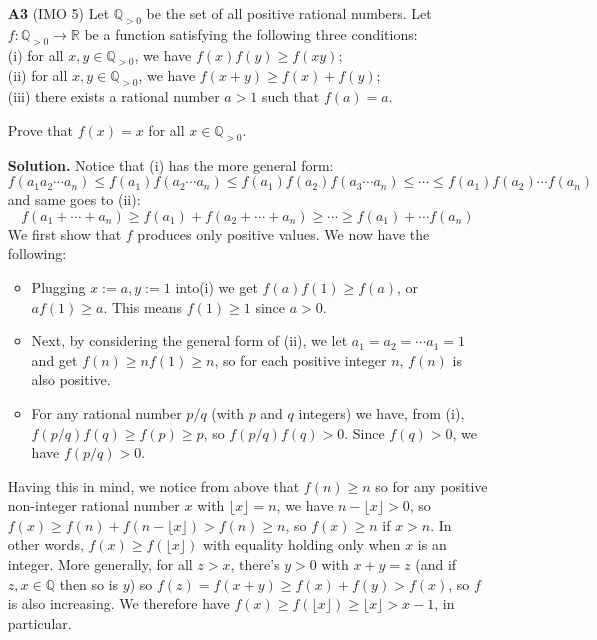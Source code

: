 \documentclass[11pt,a4paper]{article}
\begin{document}
\begin{enumerate}
	\item [\textbf{A3}] (IMO 5)
	Let $\mathbb Q_{>0}$ be the set of all positive rational numbers. Let $f:\mathbb Q_{>0}\to\mathbb R$ be a function satisfying the following three conditions:\\
	(i) for all $x,y\in\mathbb Q_{>0}$, we have $f(x)f(y)\geq f(xy)$;\\
	(ii) for all $x,y\in\mathbb Q_{>0}$, we have $f(x+y)\geq f(x)+f(y)$;\\
	(iii) there exists a rational number $a>1$ such that $f(a)=a$.
	
	Prove that $f(x)=x$ for all $x\in\mathbb Q_{>0}$.
	
	\textbf{Solution.} 
	Notice that (i) has the more general form: 
	\[
	f(a_1a_2\cdots a_n)
	\le f(a_1)f(a_2\cdots a_n)
	\le f(a_1)f(a_2)f(a_3\cdots a_n)
	\le\cdots
	\le f(a_1)f(a_2)\cdots f(a_n)
	\]
	and same goes to (ii):
	\[
	f(a_1+\cdots + a_n)
	\ge f(a_1)+f(a_2+\cdots + a_n)
	\ge
	\cdots
	\ge f(a_1)+\cdots f(a_n)
	\]
	We first show that $f$ produces only positive values. We now have the following:
	\begin{itemize}
		\item Plugging $x:=a, y:=1$ into(i) we get $f(a)f(1)\ge f(a)$, or $af(1)\ge a$. This means $f(1)\ge 1$ since $a>0$. 
		
		\item Next, by considering the general form of (ii), we let $a_1=a_2=\cdots a_1=1$ and get $f(n)\ge nf(1)\ge n$, so for each positive integer $n$, $f(n)$ is also positive. 
		
		\item For any rational number $p/q$ (with $p$ and $q$ integers) we have, from (i), $f(p/q)f(q)\ge f(p)\ge p$, so $f(p/q)f(q)>0$. 
		Since $f(q)>0$, we have $f(p/q)>0$. 
		
	\end{itemize}
	
	Having this in mind, we notice from above that $f(n)\ge n$ so for any positive non-integer rational number $x$ with $\lfloor x\rfloor=n$, we have $n-\lfloor x\rfloor>0$, so $f(x)\ge f(n)+f(n-\lfloor x\rfloor)>f(n)\ge n$, so $f(x)\ge n$ if $x>n$. 
	In other words, $f(x)\ge f(\lfloor x\rfloor)$ with equality holding only when $x$ is an integer. 
	More generally, for all $z>x$, there's $y>0$ with $x+y=z$ (and if $z, x\in\mathbb{Q}$ then so is $y$) so $f(z)=f(x+y)\ge f(x)+f(y)>f(x)$, so $f$ is also increasing. 
	We therefore have $f(x)\ge f(\lfloor x\rfloor)\ge \lfloor x\rfloor>x-1$, in particular. 
	

\end{enumerate}
\end{document}
